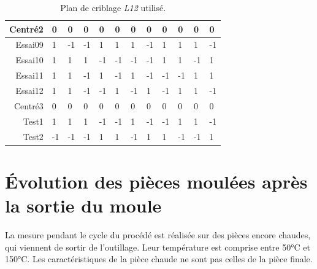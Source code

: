 \begin{table}[hbtp]
\begin{tabular}{m|m|m|m|m|m|m|m|m|m|m|m|}
		\multicolumn{1}{|r|}{Centré2} & 0      & 0       & 0      & 0      & 0     & 0     & 0     & 0      & 0     & 0      & 0     \\ \hline
		\multicolumn{1}{|r|}{Essai09} & 1      & -1      & -1     & 1      & 1     & 1     & -1    & 1      & 1     & 1      & -1    \\ \hline
		\multicolumn{1}{|r|}{Essai10} & 1      & 1       & 1      & -1     & -1    & -1    & -1    & 1      & 1     & -1     & 1     \\ \hline
		\multicolumn{1}{|r|}{Essai11} & 1      & 1       & -1     & 1      & -1    & 1     & -1    & -1     & -1    & 1      & 1     \\ \hline
		\multicolumn{1}{|r|}{Essai12} & 1      & 1       & -1     & -1     & 1     & -1    & 1     & -1     & 1     & 1      & -1    \\ \hline
		\multicolumn{1}{|r|}{Centré3} & 0      & 0       & 0      & 0      & 0     & 0     & 0     & 0      & 0     & 0      & 0     \\ \hline
		\multicolumn{1}{|r|}{Test1}   & 1      & 1       & 1      & -1     & -1    & 1     & -1    & -1     & 1     & 1      & -1    \\ \hline
		\multicolumn{1}{|r|}{Test2}   & -1     & -1      & -1     & 1      & 1     & -1    & 1     & 1      & -1    & -1     & 1     \\ \hline
	\end{tabular}
	\caption{Plan de criblage \textit{L12} utilisé.}
	\label{tab:doe_screening}
\end{table}


\newpage
\section{Évolution des pièces moulées après la sortie du moule}
La mesure pendant le cycle du procédé est réalisée sur des pièces encore chaudes, qui viennent de sortir de l'outillage.
Leur température est comprise entre 50°C et 150°C.
Les caractéristiques de la pièce chaude ne sont pas celles de la pièce finale.

